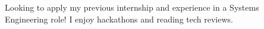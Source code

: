 

\begin{cvparagraph}
Looking to apply my previous internship and experience in a Systems Engineering role! I enjoy hackathons and reading tech reviews.
\end{cvparagraph}
